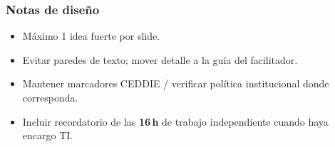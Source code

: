 \subsubsection*{Notas de diseño}
\begin{itemize}
\item Máximo 1 idea fuerte por slide.
\item Evitar paredes de texto; mover detalle a la guía del facilitador.
\item Mantener marcadores CEDDIE / verificar política institucional donde corresponda.
\item Incluir recordatorio de las \textbf{16\,h} de trabajo independiente cuando haya encargo TI.
\end{itemize}
